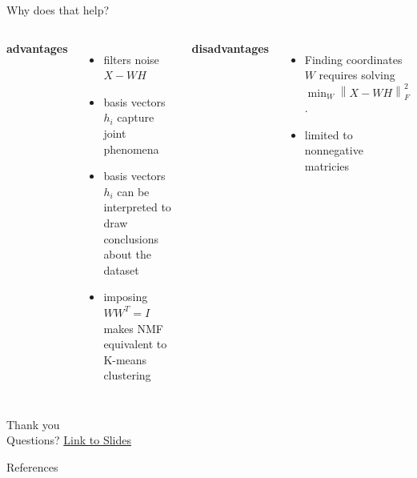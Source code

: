 \documentclass[aspectratio=169]{beamer}
\begin{document}
\begin{frame}{Why does that help?}
	\begin{columns}[t]

	\textbf{advantages}
	\begin{itemize}
	\item filters noise $X - W H $
	\item basis vectors $h_i$ capture joint phenomena
	\item basis vectors $h_i$ can be interpreted to draw conclusions about the dataset
	\item imposing $W W^T  = I $ makes NMF equivalent to K-means clustering
	\end{itemize}
	\textbf{disadvantages}
	\begin{itemize}
	\item Finding coordinates $W$ requires solving $\min_{ W}  \left\lVert X - W H\right\rVert^2_F$.
	\item limited to nonnegative matricies
	\end{itemize}
	\end{columns}
\end{frame}



\begin{frame}[focus]
	Thank you \\
	Questions?
	\vfill
	\href{https://github.com/spirousschuh/presentations/blob/master/NMF_fruit_purees/presentation/fruit_purees.pdf}
		{\small{Link to Slides}}




\end{frame}


\appendix

\begin{frame}{References}
	\nocite{*} %
	
	
\end{frame}

\end{document}
